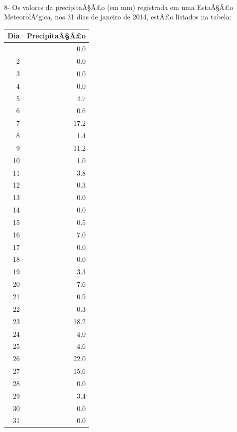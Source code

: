 ﻿\documentclass[11pt]{article}
\begin{document}
    \begin{center}
    \end{center}
    { \hspace*{\fill} \\}
    
    8- Os valores da precipitaÃ§Ã£o (em mm) registrada em uma EstaÃ§Ã£o
MeteorolÃ³gica, nos 31 dias de janeiro de 2014, estÃ£o listados na tabela:

{\def\LTcaptype{table} %
\begin{longtable}[]{@{}rr@{}}
\toprule\noalign{}
Dia & PrecipitaÃ§Ã£o \\
\midrule\noalign{}
\endhead
\bottomrule\noalign{}
\endlastfoot
1 & 0.0 \\
2 & 0.0 \\
3 & 0.0 \\
4 & 0.0 \\
5 & 4.7 \\
6 & 0.6 \\
7 & 17.2 \\
8 & 1.4 \\
9 & 11.2 \\
10 & 1.0 \\
11 & 3.8 \\
12 & 0.3 \\
13 & 0.0 \\
14 & 0.0 \\
15 & 0.5 \\
16 & 7.0 \\
17 & 0.0 \\
18 & 0.0 \\
19 & 3.3 \\
20 & 7.6 \\
21 & 0.9 \\
22 & 0.3 \\
23 & 18.2 \\
24 & 4.0 \\
25 & 4.6 \\
26 & 22.0 \\
27 & 15.6 \\
28 & 0.0 \\
29 & 3.4 \\
30 & 0.0 \\
31 & 0.0 \\
\end{longtable}
}
\end{document}
